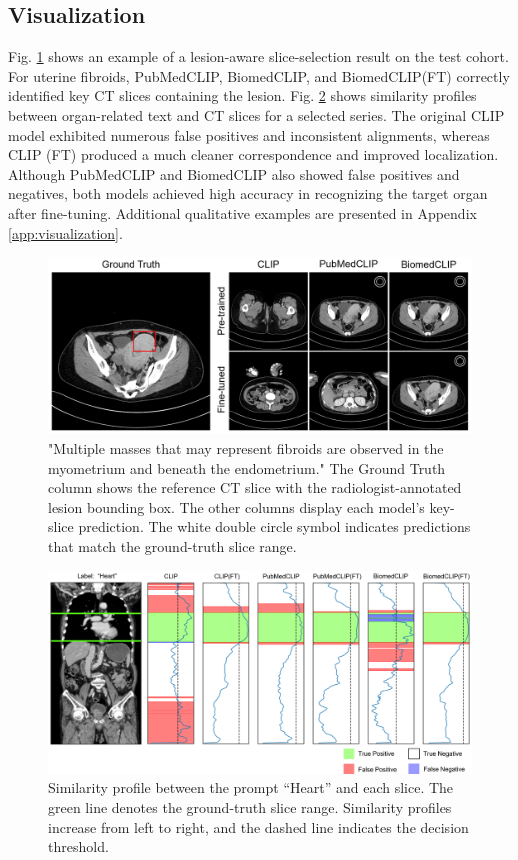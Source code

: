 \documentclass[bioengineering,article,submit,pdftex,moreauthors]{Definitions/mdpi}
\begin{document}
\subsection{Visualization}\label{sec:visualization}
Fig. \ref{fig:lesion_aware_results} shows an example of a lesion-aware slice-selection result on the test cohort. 
For uterine fibroids, PubMedCLIP, BiomedCLIP, and BiomedCLIP(FT) correctly identified key CT slices containing the lesion.
Fig. \ref{fig:organ_aware_results} shows similarity profiles between organ-related text and CT slices for a selected series. 
The original CLIP model exhibited numerous false positives and inconsistent alignments, whereas CLIP (FT) produced a much cleaner correspondence and improved localization. 
Although PubMedCLIP and BiomedCLIP also showed false positives and negatives, both models achieved high accuracy in recognizing the target organ after fine-tuning. 
Additional qualitative examples are presented in Appendix \ref{app:visualization}.


\begin{figure}[ht]
  \centering
  \includegraphics[width=1\textwidth]{./figures/figure2_4.png}
  \caption{"Multiple masses that may represent fibroids are observed in the myometrium and beneath the endometrium."
  The Ground Truth column shows the reference CT slice with the radiologist-annotated lesion bounding box.
  The other columns display each model’s key-slice prediction.
  The white double circle symbol indicates predictions that match the ground-truth slice range.
  }
  \label{fig:lesion_aware_results}
\end{figure}


\begin{figure}[ht]
  \centering
  \includegraphics[width=1\textwidth]{./figures/figure3_4.png}
  \caption{Similarity profile between the prompt “Heart” and each slice. 
  The green line denotes the ground-truth slice range. 
  Similarity profiles increase from left to right, and the dashed line indicates the decision threshold. 
  }
  \label{fig:organ_aware_results}
\end{figure}
\end{document}
